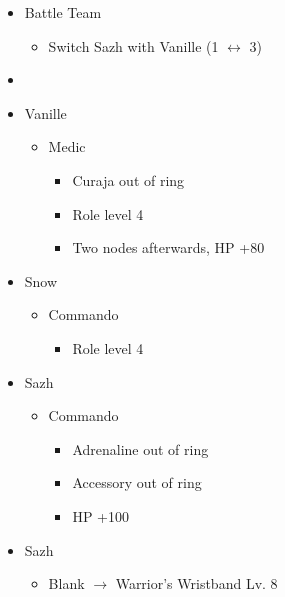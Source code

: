 \begin{menu}
\begin{itemize}
    \paradigm
    \begin{itemize}
        \item Battle Team
        \begin{itemize}
            \item Switch Sazh with Vanille (1 $\leftrightarrow$ 3)
        \end{itemize}
        \item {}%
{\paradigmline{(\med)}{\com}{(\com)}}%
{\paradigmline{(\sab)}{\com}{\com}}%
{\paradigmline{(\sab)}{\sen}{(\syn)}}%
{\paradigmline{(\rav)}{(\rav)}{\com}}%
{\paradigmline{\textit{(\sab)}}{\textit{(\rav)}}{\textit{\rav}}}%
{\paradigmline{\rav}{\rav}{\rav}}
    \end{itemize}
    \crystarium
    \begin{itemize}
        \item Vanille
        \begin{itemize}
            \item Medic
            \begin{itemize}
                \item Curaja out of ring
                \item Role level 4
                \item Two nodes afterwards, HP +80
            \end{itemize}
        \end{itemize}
        \item Snow
        \begin{itemize}
            \item Commando
            \begin{itemize}
                \item Role level 4
            \end{itemize}
        \end{itemize}
        \item Sazh
        \begin{itemize}
            \item Commando
            \begin{itemize}
                \item Adrenaline out of ring
                \item Accessory out of ring
                \item HP +100
            \end{itemize}
        \end{itemize}
    \end{itemize}
    \equip
    \begin{itemize}
        \item Sazh
        \begin{itemize}
            \item Blank $\rightarrow$ Warrior's Wristband Lv. 8
        \end{itemize}
    \end{itemize}
\end{itemize}
\end{menu}

